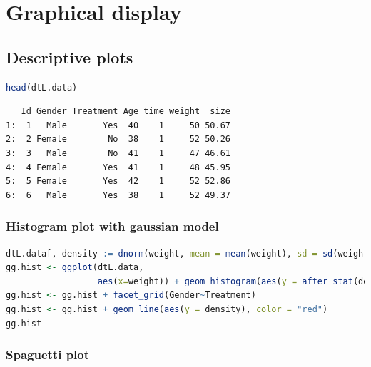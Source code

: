 \documentclass{article}
\begin{document}
\section{Graphical display}
\label{sec:orgda0a2ae}
\subsection{Descriptive plots}
\label{sec:org9e9e3a7}

\begin{lstlisting}[language=r,numbers=none]
head(dtL.data)
\end{lstlisting}

\label{}
\begin{verbatim}
   Id Gender Treatment Age time weight  size
1:  1   Male       Yes  40    1     50 50.67
2:  2 Female        No  38    1     52 50.26
3:  3   Male        No  41    1     47 46.61
4:  4 Female       Yes  41    1     48 45.95
5:  5 Female       Yes  42    1     52 52.86
6:  6   Male       Yes  38    1     52 49.37
\end{verbatim}
\subsubsection{Histogram plot with gaussian model}
\label{sec:orgfa6fdce}

\begin{lstlisting}[language=r,numbers=none]
dtL.data[, density := dnorm(weight, mean = mean(weight), sd = sd(weight)), by = c("Gender","Treatment")]
gg.hist <- ggplot(dtL.data,
                  aes(x=weight)) + geom_histogram(aes(y = after_stat(density)), bins = 100) 
gg.hist <- gg.hist + facet_grid(Gender~Treatment)
gg.hist <- gg.hist + geom_line(aes(y = density), color = "red")
gg.hist
\end{lstlisting}
\subsubsection{Spaguetti plot}
\label{sec:orgcac9992}
\end{document}
